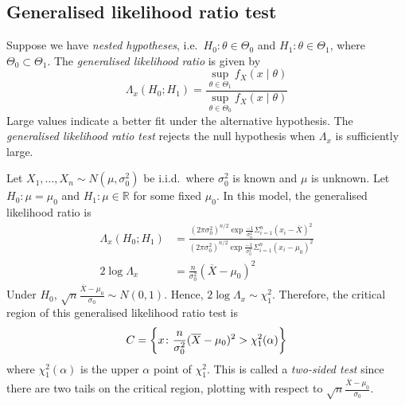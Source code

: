 \subsection{Generalised likelihood ratio test}
\begin{definition}
	Suppose we have \textit{nested hypotheses}, i.e.\ \( H_0 \colon \theta \in \Theta_0 \) and \( H_1 \colon \theta \in \Theta_1 \), where \( \Theta_0 \subset \Theta_1 \).
	The \textit{generalised likelihood ratio} is given by
	\[ \Lambda_x(H_0; H_1) = \frac{\sup_{\theta \in \Theta_1} f_X(x \mid \theta)}{\sup_{\theta \in \Theta_0} f_X(x \mid \theta)} \]
	Large values indicate a better fit under the alternative hypothesis.
	The \textit{generalised likelihood ratio test} rejects the null hypothesis when \( \Lambda_x \) is sufficiently large.
\end{definition}
\begin{example}
	Let \( X_1, \dots, X_n \sim N(\mu, \sigma_0^2) \) be i.i.d.\ where \( \sigma_0^2 \) is known and \( \mu \) is unknown.
	Let \( H_0 \colon \mu = \mu_0 \) and \( H_1 \colon \mu \in \mathbb R \) for some fixed \( \mu_0 \).
	In this model, the generalised likelihood ratio is
	\begin{align*}
		\Lambda_x(H_0; H_1) &= \frac{(2 \pi \sigma_0^2)^{n/2} \exp{\frac{-1}{\sigma_0^2} \Sigma_{i=1}^n (x_i - \overline X)^2}}{(2 \pi \sigma_0^2)^{n/2} \exp{\frac{-1}{\sigma_0^2} \Sigma_{i=1}^n (x_i - \mu_0)^2}} \\
		2\log \Lambda_x &= \frac{n}{\sigma_0^2}(\overline X - \mu_0)^2
	\end{align*}
	Under \( H_0 \), \( \sqrt{n} \frac{\overline X - \mu_0}{\sigma_0} \sim N(0,1) \).
	Hence, \( 2 \log \Lambda_x \sim \chi_1^2 \).
	Therefore, the critical region of this generalised likelihood ratio test is
	\[ C = \qty{x \colon \frac{n}{\sigma_0^2}(\overline X - \mu_0)^2 > \chi_1^2(\alpha)} \]
	where \( \chi_1^2(\alpha) \) is the upper \( \alpha \) point of \( \chi_1^2 \).
	This is called a \textit{two-sided test} since there are two tails on the critical region, plotting with respect to \( \sqrt{n} \frac{\overline X - \mu_0}{\sigma_0} \).
\end{example}

